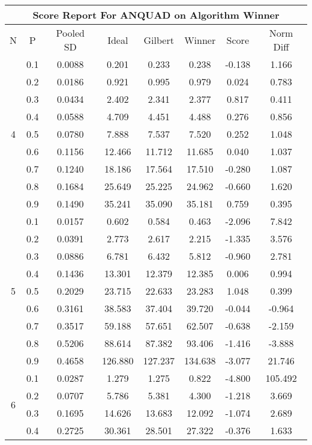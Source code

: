 \documentclass[11pt,a4paper]{report}
\begin{document}
\begin{longtable}{ | c | c || c | c | c | c | c | c | }
\hline
\multicolumn{8}{|c|}{ Score Report For ANQUAD on Algorithm Winner} \\
\hline
N & P & Pooled SD &  Ideal &  Gilbert & Winner  & Score & Norm Diff \\
 \hline
 \hline
 \endhead
\multirow{9}{*}{4} & 0.1 & 0.0088 & 0.201 & 0.233 & 0.238 & -0.138 & 1.166 \\
 & 0.2 & 0.0186 & 0.921 & 0.995 & 0.979 & 0.024 & 0.783 \\
 & 0.3 & 0.0434 & 2.402 & 2.341 & 2.377 & 0.817 & 0.411 \\
 & 0.4 & 0.0588 & 4.709 & 4.451 & 4.488 & 0.276 & 0.856 \\
 & 0.5 & 0.0780 & 7.888 & 7.537 & 7.520 & 0.252 & 1.048 \\
 & 0.6 & 0.1156 & 12.466 & 11.712 & 11.685 & 0.040 & 1.037 \\
 & 0.7 & 0.1240 & 18.186 & 17.564 & 17.510 & -0.280 & 1.087 \\
 & 0.8 & 0.1684 & 25.649 & 25.225 & 24.962 & -0.660 & 1.620 \\
 & 0.9 & 0.1490 & 35.241 & 35.090 & 35.181 & 0.759 & 0.395 \\
 \hline
\multirow{9}{*}{5} & 0.1 & 0.0157 & 0.602 & 0.584 & 0.463 & -2.096 & 7.842 \\
 & 0.2 & 0.0391 & 2.773 & 2.617 & 2.215 & -1.335 & 3.576 \\
 & 0.3 & 0.0886 & 6.781 & 6.432 & 5.812 & -0.960 & 2.781 \\
 & 0.4 & 0.1436 & 13.301 & 12.379 & 12.385 & 0.006 & 0.994 \\
 & 0.5 & 0.2029 & 23.715 & 22.633 & 23.283 & 1.048 & 0.399 \\
 & 0.6 & 0.3161 & 38.583 & 37.404 & 39.720 & -0.044 & -0.964 \\
 & 0.7 & 0.3517 & 59.188 & 57.651 & 62.507 & -0.638 & -2.159 \\
 & 0.8 & 0.5206 & 88.614 & 87.382 & 93.406 & -1.416 & -3.888 \\
 & 0.9 & 0.4658 & 126.880 & 127.237 & 134.638 & -3.077 & 21.746 \\
 \hline
\multirow{9}{*}{6} & 0.1 & 0.0287 & 1.279 & 1.275 & 0.822 & -4.800 & 105.492 \\
 & 0.2 & 0.0707 & 5.786 & 5.381 & 4.300 & -1.218 & 3.669 \\
 & 0.3 & 0.1695 & 14.626 & 13.683 & 12.092 & -1.074 & 2.689 \\
 & 0.4 & 0.2725 & 30.361 & 28.501 & 27.322 & -0.376 & 1.633 \\

\end{longtable}
\end{document}
